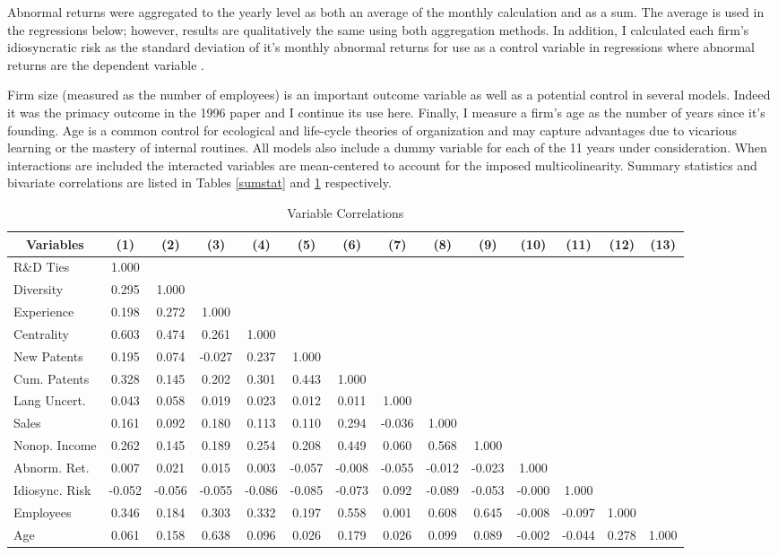 Abnormal returns were aggregated to the yearly level as both an average of the monthly calculation and as a sum. The average is used in the regressions below; however, results are qualitatively the same using both aggregation methods. In addition, I calculated each firm's idiosyncratic risk as the standard deviation of it's monthly abnormal returns for use as a control variable in regressions where abnormal returns are the dependent variable \citep{sorescu2008}.

Firm size (measured as the number of employees) is an important outcome variable as well as a potential control in several models. Indeed it was the primacy outcome in the 1996 paper and I continue its use here. Finally, I measure a firm's age as the number of years since it's founding. Age is a common control for ecological and life-cycle theories of organization \citep{powell1999} and may capture advantages due to vicarious learning or the mastery of internal routines. All models also include a dummy variable for each of the 11 years under consideration. When interactions are included the interacted variables are mean-centered to account for the imposed multicolinearity. Summary statistics and bivariate correlations are listed in Tables \ref{sumstat} and \ref{corrtable} respectively.


\begin{landscape}
\begin{table}[htbp]\centering \caption{Variable Correlations\label{corrtable}}
\begin{tabular}{l  c  c  c  c  c  c  c  c  c  c  c  c  c }\hline\hline
\multicolumn{1}{c}{Variables} &(1)&(2)&(3)&(4)&(5)&(6)&(7)&(8)&(9)&(10)&(11)&(12)&(13)\\ \hline
R\&D Ties&1.000\\
Diversity&0.295&1.000\\
Experience&0.198&0.272&1.000\\
Centrality&0.603&0.474&0.261&1.000\\
New Patents&0.195&0.074&-0.027&0.237&1.000\\
Cum. Patents&0.328&0.145&0.202&0.301&0.443&1.000\\
Lang Uncert.&0.043&0.058&0.019&0.023&0.012&0.011&1.000\\
Sales&0.161&0.092&0.180&0.113&0.110&0.294&-0.036&1.000\\
Nonop. Income&0.262&0.145&0.189&0.254&0.208&0.449&0.060&0.568&1.000\\
Abnorm. Ret.&0.007&0.021&0.015&0.003&-0.057&-0.008&-0.055&-0.012&-0.023&1.000\\
Idiosync. Risk&-0.052&-0.056&-0.055&-0.086&-0.085&-0.073&0.092&-0.089&-0.053&-0.000&1.000\\
Employees&0.346&0.184&0.303&0.332&0.197&0.558&0.001&0.608&0.645&-0.008&-0.097&1.000\\
Age&0.061&0.158&0.638&0.096&0.026&0.179&0.026&0.099&0.089&-0.002&-0.044&0.278&1.000\\
\hline \hline 
 \end{tabular}
\end{table}
\end{landscape}


